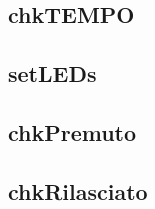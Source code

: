 \documentclass[DIV=24]{scrartcl}
\begin{document}
	\subsection{chkTEMPO}
    \begin{center}
        
    \end{center}
    \subsection{setLEDs}
    \begin{center}
        
    \end{center}       
    \subsection{chkPremuto}
    \begin{center}
        
    \end{center}    
    \subsection{chkRilasciato}
    \begin{center}
        
    \end{center}
%                
%                
%        
\end{document}
